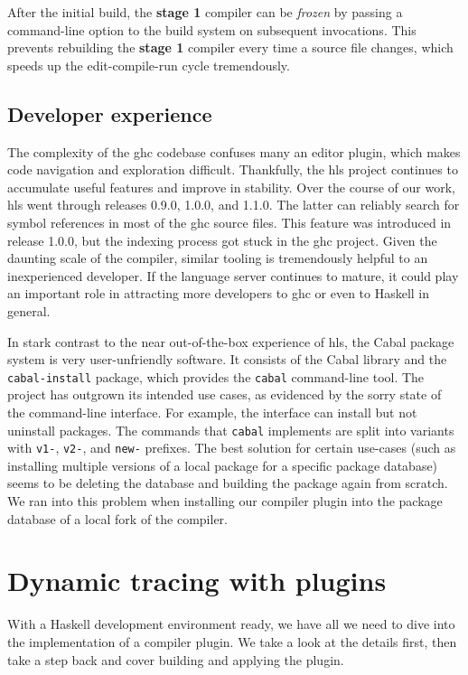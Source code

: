 \documentclass[thesis=B,english]{FITthesis}[2019/12/23]
\newcommand{\hackage}[1]{\texttt{#1}}
\begin{document}
After the initial build, the \textbf{stage 1} compiler can be \textit{frozen}
by passing a command-line option to the build system on subsequent invocations.
This prevents rebuilding the \textbf{stage 1} compiler every time a source file
changes, which speeds up the edit-compile-run cycle tremendously.

\subsection*{Developer experience}
The complexity of the \acrshort{ghc} codebase confuses many an editor plugin,
which makes code navigation and exploration difficult. Thankfully, the
\acrshort{hls} project continues to accumulate useful features and improve in
stability. Over the course of our work, \acrshort{hls} went through releases
0.9.0, 1.0.0, and 1.1.0. The latter can reliably search for symbol references
in most of the \acrshort{ghc} source files. This feature was introduced in
release 1.0.0, but the indexing process got stuck in the \acrshort{ghc}
project. Given the daunting scale of the compiler, similar tooling is
tremendously helpful to an inexperienced developer. If the language server
continues to mature, it could play an important role in attracting more
developers to \acrshort{ghc} or even to Haskell in general.

In stark contrast to the near out-of-the-box experience of \acrshort{hls}, the
Cabal package system is very user-unfriendly software. It consists of the Cabal
library and the \hackage{cabal-install} package, which provides the
\texttt{cabal} command-line tool. The project has outgrown its intended use
cases, as evidenced by the sorry state of the command-line interface. For
example, the interface can install but not uninstall packages. The commands
that \texttt{cabal} implements are split into variants with \texttt{v1-},
\texttt{v2-}, and \texttt{new-} prefixes. The best solution for certain
use-cases (such as installing multiple versions of a local package for a
specific package database) seems to be deleting the database and building the
package again from scratch. We ran into this problem when installing our
compiler plugin into the package database of a local fork of the compiler.

\section{Dynamic tracing with plugins}
With a Haskell development environment ready, we have all we need to dive into
the implementation of a compiler plugin. We take a look at the details first,
then take a step back and cover building and applying the plugin.
\end{document}
